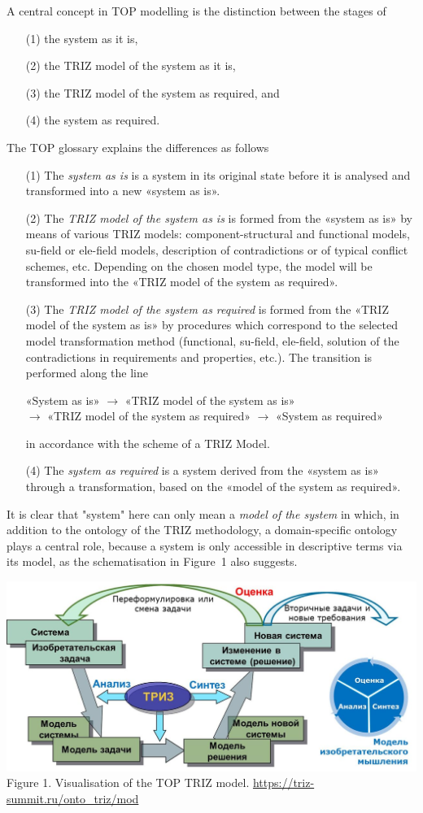 \documentclass[11pt,a4paper]{article}
\begin{document}
A central concept in TOP modelling is the distinction between the stages of 
\begin{itemize}[noitemsep]
\item [(1)] the system as it is,
\item [(2)] the TRIZ model of the system as it is,
\item [(3)] the TRIZ model of the system as required, and 
\item [(4)] the system as required. 
\end{itemize}
The TOP glossary \cite{TOP-Glossary} explains the differences as follows
\begin{itemize}[noitemsep]
\item [(1)] The \emph{system as is} is a system in its original state before
  it is analysed and transformed into a new «system as is».
\item [(2)] The \emph{TRIZ model of the system as is} is formed from the
  «system as is» by means of various TRIZ models: component-structural and
  functional models, su-field or ele-field models, description of
  contradictions or of typical conflict schemes, etc. Depending on the chosen
  model type, the model will be transformed into the «TRIZ model of the system
  as required».
\item [(3)] The \emph{TRIZ model of the system as required} is formed from the
  «TRIZ model of the system as is» by procedures which correspond to the
  selected model transformation method (functional, su-field, ele-field,
  solution of the contradictions in requirements and properties, etc.). The
  transition is performed along the line
  \begin{center}
    «System as is» $\to$ «TRIZ model of the system as is»\\ $\to$ «TRIZ model
    of the system as required» $\to$ «System as required»
  \end{center}
  in accordance with the scheme of a TRIZ Model.
\item [(4)] The \emph{system as required} is a system derived from the «system
  as is» through a transformation, based on the «model of the system as
  required».
 \end{itemize}
It is clear that "system" here can only mean a \emph{model of the system} in
which, in addition to the ontology of the TRIZ methodology, a domain-specific
ontology plays a central role, because a system is only accessible in
descriptive terms via its model, as the schematisation in Figure~1 also
suggests.
\begin{center}
  \includegraphics[width=.6\textwidth]{Rubin.jpeg}\\
  Figure 1. Visualisation of the TOP TRIZ model.
  \url{https://triz-summit.ru/onto_triz/mod}
\end{center}
\end{document}
